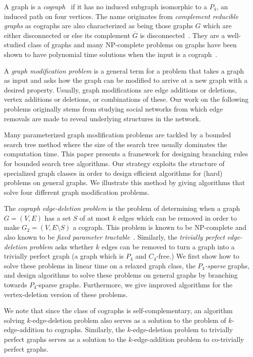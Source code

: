 \documentclass{llncs}
\begin{document}
A graph is a \emph{cograph}~\cite{Sein} if it has no induced subgraph isomorphic to a $P_4$, an induced path on four vertices. The name originates from \emph{complement reducible graphs} as cographs are also characterized as being those graphs $G$ which are either disconnected or else its complement $\overline{G}$ is disconnected~\cite{Sein}. They are a well-studied class of graphs and many NP-complete problems on graphs have been shown to have polynomial time solutions when the input is a cograph~\cite{CPS}.

A \emph{graph modification problem} is a general term for a problem that takes a graph as input and asks how the graph can be modified to arrive at a new graph with a desired property. Usually, graph modifications are edge additions or deletions, vertex additions or deletions, or combinations of these. Our work on the following problems originally stems from studying social networks from which edge removals are made to reveal underlying structures in the network.

Many parameterized graph modification problems are tackled by a bounded search tree method where the size of the search tree usually dominates the computation time. This paper presents a framework for designing branching rules for bounded search tree algorithms. Our strategy exploits the structure of specialized graph classes in order to design efficient algorithms for (hard) problems on general graphs. We illustrate this method by giving algorithms that solve four different graph modification problems.

The \emph{cograph edge-deletion problem} is the problem of determining when a graph $G=(V,E)$ has a set $S$ of at most $k$ edges which can be removed in order to make $G_2=(V,E \setminus S)$ a cograph. This problem is known to be NP-complete \cite{ElMC} and also known to be \emph{fixed parameter tractable}~\cite{CAI}. Similarly, the \emph{trivially perfect edge-deletion problem} asks whether $k$ edges can be removed to turn a graph into a trivially perfect graph (a graph which is $P_4$ and $C_4$-free.) We first show how to solve these problems in linear time on a relaxed graph class, the \emph{$P_4$-sparse} graphs, and design algorithms to solve these problems on general graphs by branching towards $P_4$-sparse graphs. Furthermore, we give improved algorithms for the vertex-deletion version of these problems.

We note that since the class of cographs is self-complementary, an algorithm solving $k$-edge-deletion problem also serves as a solution to the problem of $k$-edge-addition to cographs. Similarly, the $k$-edge-deletion problem to trivially perfect graphs serves as a solution to the $k$-edge-addition problem to co-trivially perfect graphs.
\end{document}
